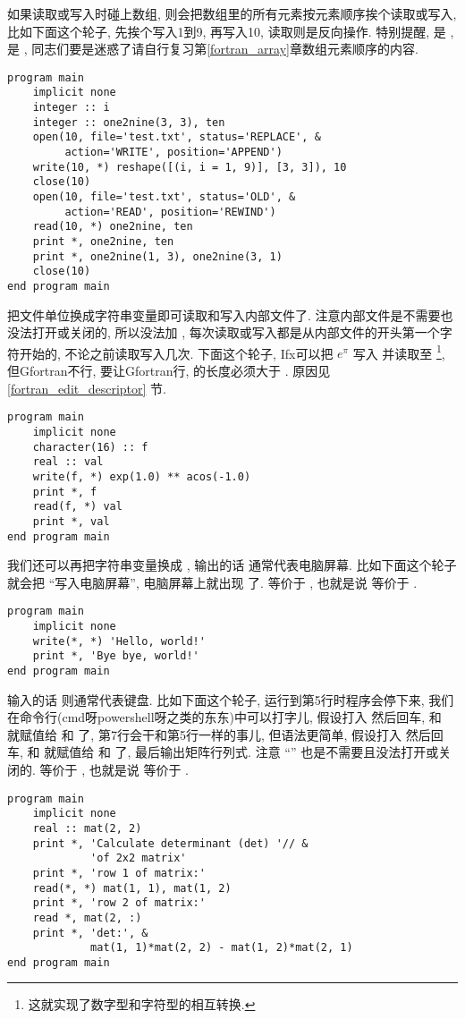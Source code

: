 如果读取或写入时碰上数组, 则会把数组里的所有元素按元素顺序挨个读取或写入, 比如下面这个轮子, 先挨个写入1到9, 再写入10, 读取则是反向操作. 特别提醒,  是 ,  是 , 同志们要是迷惑了请自行复习第\ref{fortran_array}章数组元素顺序的内容. 
\begin{lstlisting}
program main
    implicit none
    integer :: i
    integer :: one2nine(3, 3), ten
    open(10, file='test.txt', status='REPLACE', &
         action='WRITE', position='APPEND')
    write(10, *) reshape([(i, i = 1, 9)], [3, 3]), 10
    close(10)
    open(10, file='test.txt', status='OLD', &
         action='READ', position='REWIND')
    read(10, *) one2nine, ten
    print *, one2nine, ten
    print *, one2nine(1, 3), one2nine(3, 1)
    close(10)
end program main
\end{lstlisting}

把文件单位换成字符串变量即可读取和写入内部文件了. 注意内部文件是不需要也没法打开或关闭的, 所以没法加 , 每次读取或写入都是从内部文件的开头第一个字符开始的, 不论之前读取写入几次. 下面这个轮子, Ifx可以把 $ e^\pi $ 写入  并读取至 \footnote{这就实现了数字型和字符型的相互转换.}, 但Gfortran不行, 要让Gfortran行,  的长度必须大于 . 原因见 \ref{fortran_edit_descriptor} 节. \label{internal_file}
\begin{lstlisting}
program main
    implicit none
    character(16) :: f
    real :: val
    write(f, *) exp(1.0) ** acos(-1.0)
    print *, f
    read(f, *) val
    print *, val
end program main
\end{lstlisting}

我们还可以再把字符串变量换成 \ttt{*}, 输出的话 \ttt{*} 通常代表电脑屏幕. 比如下面这个轮子就会把  ``写入电脑屏幕'', 电脑屏幕上就出现  了.  等价于 , 也就是说  等价于 .
\begin{lstlisting}
program main
    implicit none
    write(*, *) 'Hello, world!'
    print *, 'Bye bye, world!'
end program main
\end{lstlisting}
输入的话 \ttt{*} 则通常代表键盘. 比如下面这个轮子, 运行到第5行时程序会停下来, 我们在命令行(cmd呀powershell呀之类的东东)中可以打字儿, 假设打入  然后回车, 和  就赋值给  和  了, 第7行会干和第5行一样的事儿, 但语法更简单, 假设打入 然后回车, 和 就赋值给  和  了, 最后输出矩阵行列式. 注意 ``\ttt{*}'' 也是不需要且没法打开或关闭的.  等价于 , 也就是说  等价于 .
\begin{lstlisting}
program main
    implicit none
    real :: mat(2, 2)
    print *, 'Calculate determinant (det) '// &
             'of 2x2 matrix'
    print *, 'row 1 of matrix:'
    read(*, *) mat(1, 1), mat(1, 2)
    print *, 'row 2 of matrix:'
    read *, mat(2, :)
    print *, 'det:', &
             mat(1, 1)*mat(2, 2) - mat(1, 2)*mat(2, 1)
end program main
\end{lstlisting}

